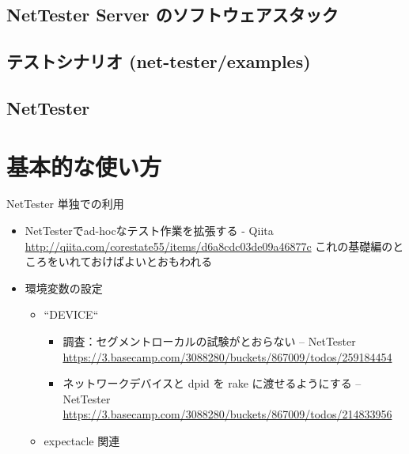 
  \subsection{NetTester Server のソフトウェアスタック}


  \subsection{テストシナリオ (net-tester/examples)}

  \subsection{NetTester}

\section{基本的な使い方}

NetTester 単独での利用
\begin{itemize}
 \item NetTesterでad-hocなテスト作業を拡張する - Qiita \url{http://qiita.com/corestate55/items/d6a8cdc03de09a46877c}
       これの基礎編のところをいれておけばよいとおもわれる
 \item 環境変数の設定
       \begin{itemize}
        \item ``DEVICE``
              \begin{itemize}
               \item 調査：セグメントローカルの試験がとおらない – NetTester \url{https://3.basecamp.com/3088280/buckets/867009/todos/259184454}
               \item ネットワークデバイスと dpid を rake に渡せるようにする – NetTester \url{https://3.basecamp.com/3088280/buckets/867009/todos/214833956}
              \end{itemize}
        \item expectacle 関連
       \end{itemize}
\end{itemize}

